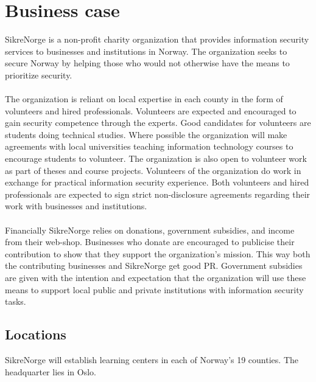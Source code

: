 \clearpage
{}


\section{Business case}

SikreNorge is a non-profit charity organization that provides information security services to businesses and institutions in Norway. The organization seeks to secure Norway by helping those who would not otherwise have the means to prioritize security.
\\
\\
The organization is reliant on local expertise in each county in the form of volunteers and hired professionals. Volunteers are expected and encouraged to gain security competence through the experts. Good candidates for volunteers are students doing technical studies. Where possible the organization will make agreements with local universities teaching information technology courses to encourage students to volunteer. The organization is also open to volunteer work as part of theses and course projects. Volunteers of the organization do work in exchange for practical information security experience. Both volunteers and hired professionals are expected to sign strict non-disclosure agreements regarding their work with businesses and institutions.
\\
\\
Financially SikreNorge relies on donations, government subsidies, and income from their web-shop. Businesses who donate are encouraged to publicise their contribution to show that they support the organization's mission. This way both the contributing businesses and SikreNorge get good PR. Government subsidies are given with the intention and expectation that the organization will use these means to support local public and private institutions with information security tasks.

\subsection{Locations}

SikreNorge will establish learning centers in each of Norway's 19 counties. The headquarter lies in Oslo.


